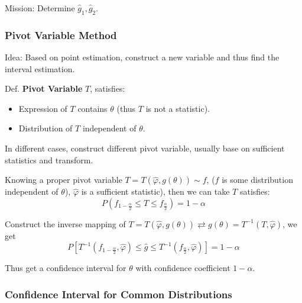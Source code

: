     Mission: Determine $\hat{g}_1,\hat{g}_2$.


\subsubsection{Pivot Variable Method}\label{SubSectionPivotVariableMethod}
    Idea: Based on point estimation, construct a new variable and thus find the interval estimation.

    Def. \textbf{Pivot Variable} $T$, satisfies: 
    \begin{itemize}[itemsep= -2 pt,parsep= -2 pt]
        \item Expression of $T$ contains $\theta$ (thus $T$ is not a statistic).
        \item Distribution of $T$ independent of $\theta$.
    \end{itemize}

    In different cases, construct different pivot variable, usually base on sufficient statistics and transform.
    
    Knowing a proper pivot variable $T=T(\hat{\varphi},g(\theta))\sim f$, ($f$ is some distribution independent of $\theta$), $\hat{\varphi}$ is a sufficient statistic), then we can take $T$ satisfies:
    \[
        P(f_{1-\frac{\alpha}{2}}\leq T\leq f_{\frac{\alpha}{2}})=1-\alpha
    \]

    Construct the inverse mapping of $T=T(\hat{\varphi},g(\theta))\rightleftarrows g(\theta)=T^{-1}(T,\hat{\varphi})$, we get
    \[
        P[T^{-1}(f_{1-\frac{\alpha}{2}},\hat{\varphi})\leq\hat{g}\leq T^{-1}(f_{\frac{\alpha}{2}},\hat{\varphi})]=1-\alpha
    \]
    
    Thus get a confidence interval for $\theta$ with confidence coefficient $1-\alpha$.\\



\subsubsection{Confidence Interval for Common Distributions}\label{SubSectionConfidenceIntervalForDistributions}

